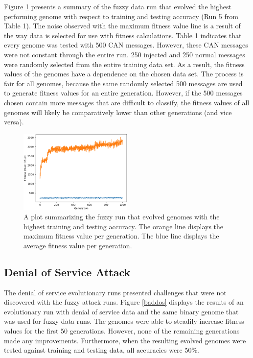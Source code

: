 \documentclass[10pt,conference]{IEEEtran}
\begin{document}
Figure \ref{bestfuzzyrun} presents a summary of the fuzzy data run that evolved the highest performing genome with respect to training and testing accuracy (Run 5 from Table 1).  The noise observed with the maximum fitness value line is a result of the way data is selected for use with fitness calculations.  Table 1 indicates that every genome was tested with 500 CAN messages.  However, these CAN messages were not constant through the entire run.  250 injected and 250 normal messages were randomly selected from the entire training data set.  As a result, the fitness values of the genomes have a dependence on the chosen data set.  The process is fair for all genomes, because the same randomly selected 500 messages are used to generate fitness values for an entire generation.  However, if the 500 messages chosen contain more messages that are difficult to classify, the fitness values of all genomes will likely be comparatively lower than other generations (and vice versa).  

\begin{figure}[H]
    \centering
    \includegraphics[width=0.5\textwidth]{best-fuzzy-run.png}
    \caption{A plot summarizing the fuzzy run that evolved genomes with the highest training and testing accuracy.  The orange line displays the maximum fitness value per generation.  The blue line displays the average fitness value per generation.}
    \label{bestfuzzyrun}
\end{figure}

\subsection{Denial of Service Attack}

The denial of service evolutionary runs presented challenges that were not discovered with the fuzzy attack runs.  Figure \ref{baddos} displays the results of an evolutionary run with denial of service data and the same binary genome that was used for fuzzy data runs.  The genomes were able to steadily increase fitness values for the first 50 generations.  However, none of the remaining generations made any improvements.  Furthermore, when the resulting evolved genomes were tested against training and testing data, all accuracies were 50\%.  
\end{document}
